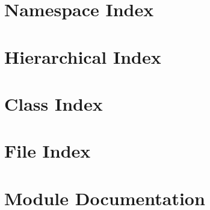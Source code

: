 \documentclass[twoside]{book}
\newcommand{\+}{\discretionary{\mbox{\scriptsize$\hookleftarrow$}}{}{}}
\begin{document}
\chapter{Namespace Index}

\chapter{Hierarchical Index}

\chapter{Class Index}

\chapter{File Index}

\chapter{Module Documentation}














































\end{document}
